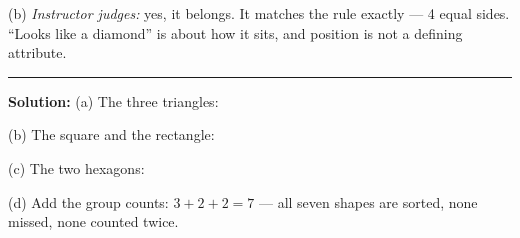 \documentclass[12pt]{article}
\begin{document}
(b) \emph{Instructor judges:} yes, it belongs. It matches the rule exactly
--- 4 equal sides. ``Looks like a diamond'' is about how it sits, and
position is not a defining attribute.

\vspace{0.2cm}\noindent\rule{\linewidth}{0.2pt}\vspace{0.1cm}


\textbf{Solution:} (a) The three triangles: 

(b) The square and the rectangle: 

(c) The two hexagons: 

(d) Add the group counts: $3 + 2 + 2 = 7$ --- all seven shapes are sorted,
none missed, none counted twice. 
\end{document}
